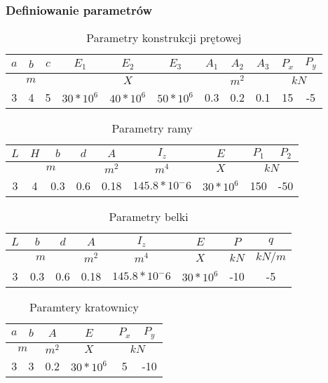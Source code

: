 \subsubsection{Definiowanie parametrów}

\begin{table}[h]
    \centering
    \begin{tabular}{|c|c|c|c|c|c|c|c|c|c|c|}
        \hline
        $a$ & $b$ & $c$ & $E_1$ & $E_2$ & $E_3$ & $A_1$ & $A_2$ & $A_3$ & $P_x$ & $P_y$ \\
        \hline
        \multicolumn{3}{|c|}{$m$} & \multicolumn{3}{|c|}{$X$} & \multicolumn{3}{|c|}{$m^2$} & \multicolumn{2}{|c|}{$kN$} \\
        \hline
        3 & 4 & 5 & $30*10^6$ & $40*10^6$ & $50*10^6$ & 0.3 & 0.2 & 0.1 & 15 & -5 \\
        \hline
    \end{tabular}
    \caption{Parametry konstrukcji prętowej}
\end{table}

\begin{table}[h]
    \centering
    \begin{tabular}{|c|c|c|c|c|c|c|c|c|}
        \hline
        $L$ & $H$ & $b$ & $d$ & $A$ & $I_z$ & $E$ & $P_1$ & $P_2$ \\
        \hline
        \multicolumn{4}{|c|}{$m$} & $m^2$ & $m^4$ & $X$ & \multicolumn{2}{|c|}{$kN$} \\
        \hline
        3 & 4 & 0.3 & 0.6 & 0.18 & $145.8*10^-6$ & $30*10^6$ & 150 & -50 \\
        \hline
    \end{tabular}
    \caption{Parametry ramy}
\end{table}

\begin{table}[h]
    \centering
    \begin{tabular}{|c|c|c|c|c|c|c|c|}
        \hline
        $L$ & $b$ & $d$ & $A$ & $I_z$ & $E$ & $P$ & $q$ \\
        \hline
        \multicolumn{3}{|c|}{$m$} & $m^2$ & $m^4$ & $X$ & $kN$ & $kN/m$ \\
        \hline
        3 & 0.3 & 0.6 & 0.18 & $145.8*10^-6$ & $30*10^6$ & -10 & -5 \\
        \hline
    \end{tabular}
    \caption{Parametry belki}
\end{table}

\begin{table}[h]
    \centering
    \begin{tabular}{|c|c|c|c|c|c|}
        \hline
        $a$ & $b$ & $A$ & $E$ & $P_x$ & $P_y$ \\
        \hline
        \multicolumn{2}{|c|}{$m$} & $m^2$ & $X$ & \multicolumn{2}{|c|}{$kN$} \\
        \hline
        3 & 3 & 0.2 & $30*10^6$ & 5 & -10 \\
        \hline
    \end{tabular}
    \caption{Paramtery kratownicy}
\end{table}

